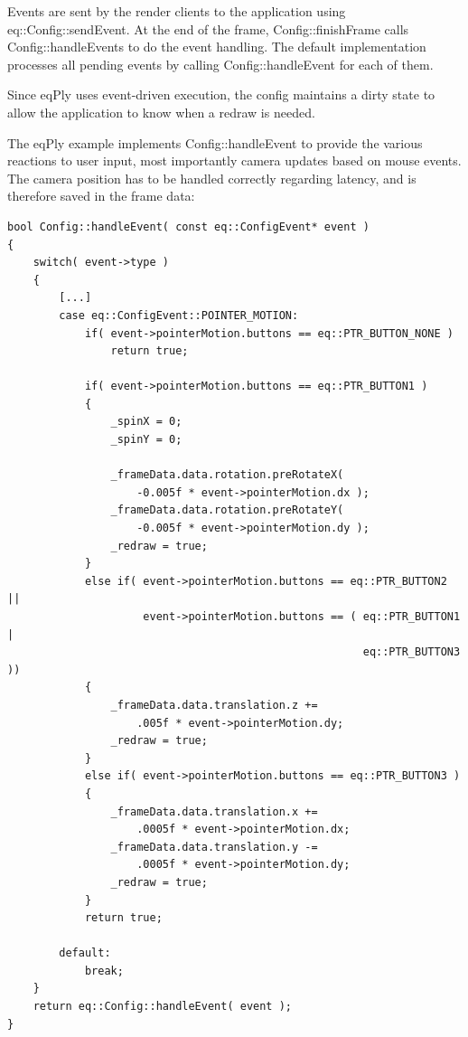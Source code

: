 \documentclass[10pt,a4]{scrartcl}
\begin{document}
Events are sent by the render clients to the application using
\textsf{eq::Config::sendEvent}. At the end of the frame,
\textsf{Config::finishFrame} calls \textsf{Config::handleEvents} to do
the event handling. The default implementation processes all pending
events by calling \textsf{Config::handleEvent} for each of them.

Since \textsf{eqPly} uses event-driven execution, the config maintains a
dirty state to allow the application to know when a redraw is needed.

The \textsf{eqPly} example implements \textsf{Config::hand\-le\-Event}
to provide the various reactions to user input, most importantly camera
updates based on mouse events. The camera position has to be handled
correctly regarding latency, and is therefore saved in the frame data:

{\footnotesize\begin{lstlisting}
bool Config::handleEvent( const eq::ConfigEvent* event )
{
    switch( event->type )
    {
        [...]
        case eq::ConfigEvent::POINTER_MOTION:
            if( event->pointerMotion.buttons == eq::PTR_BUTTON_NONE )
                return true;

            if( event->pointerMotion.buttons == eq::PTR_BUTTON1 )
            {
                _spinX = 0;
                _spinY = 0;

                _frameData.data.rotation.preRotateX( 
                    -0.005f * event->pointerMotion.dx );
                _frameData.data.rotation.preRotateY(
                    -0.005f * event->pointerMotion.dy );
                _redraw = true;
            }
            else if( event->pointerMotion.buttons == eq::PTR_BUTTON2 ||
                     event->pointerMotion.buttons == ( eq::PTR_BUTTON1 |
                                                       eq::PTR_BUTTON3 ))
            {
                _frameData.data.translation.z +=
                    .005f * event->pointerMotion.dy;
                _redraw = true;
            }
            else if( event->pointerMotion.buttons == eq::PTR_BUTTON3 )
            {
                _frameData.data.translation.x += 
                    .0005f * event->pointerMotion.dx;
                _frameData.data.translation.y -= 
                    .0005f * event->pointerMotion.dy;
                _redraw = true;
            }
            return true;
            
        default:
            break;
    }
    return eq::Config::handleEvent( event );
}
\end{lstlisting}}
\end{document}
